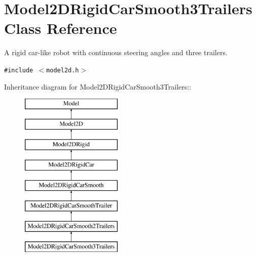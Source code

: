 \section{Model2DRigid\-Car\-Smooth3Trailers  Class Reference}
\label{classModel2DRigidCarSmooth3Trailers}
A rigid car-like robot with continuous steering angles and three trailers. 


{\tt \#include $<$model2d.h$>$}

Inheritance diagram for Model2DRigid\-Car\-Smooth3Trailers::\begin{figure}[H]
\begin{center}
\leavevmode
\includegraphics[height=8cm]{classModel2DRigidCarSmooth3Trailers}
\end{center}
\end{figure}
